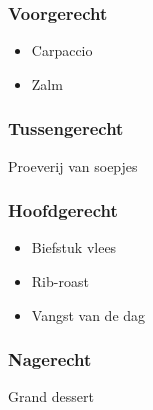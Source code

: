 \subsubsection*{Voorgerecht}
\begin{itemize}
	\item Carpaccio
	\item Zalm
\end{itemize}

\subsubsection*{Tussengerecht}
Proeverij van soepjes

\subsubsection*{Hoofdgerecht}
\begin{itemize}
	\item Biefstuk vlees
	\item Rib-roast
	\item Vangst van de dag
\end{itemize}

\subsubsection*{Nagerecht}
Grand dessert
